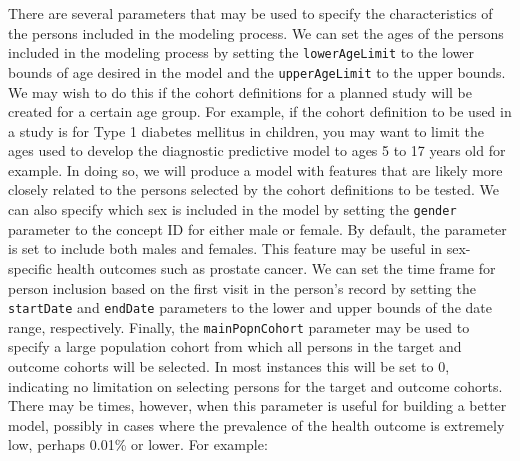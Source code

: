 \documentclass[11pt]{book}
\theoremstyle{definition}
\theoremstyle{definition}
\theoremstyle{definition}
\theoremstyle{remark}
\begin{document}
There are several parameters that may be used to specify the
characteristics of the persons included in the modeling process. We can
set the ages of the persons included in the modeling process by setting
the \texttt{lowerAgeLimit} to the lower bounds of age desired in the
model and the \texttt{upperAgeLimit} to the upper bounds. We may wish to
do this if the cohort definitions for a planned study will be created
for a certain age group. For example, if the cohort definition to be
used in a study is for Type 1 diabetes mellitus in children, you may
want to limit the ages used to develop the diagnostic predictive model
to ages 5 to 17 years old for example. In doing so, we will produce a
model with features that are likely more closely related to the persons
selected by the cohort definitions to be tested. We can also specify
which sex is included in the model by setting the \texttt{gender}
parameter to the concept ID for either male or female. By default, the
parameter is set to include both males and females. This feature may be
useful in sex-specific health outcomes such as prostate cancer. We can
set the time frame for person inclusion based on the first visit in the
person's record by setting the \texttt{startDate} and \texttt{endDate}
parameters to the lower and upper bounds of the date range,
respectively. Finally, the \texttt{mainPopnCohort} parameter may be used
to specify a large population cohort from which all persons in the
target and outcome cohorts will be selected. In most instances this will
be set to 0, indicating no limitation on selecting persons for the
target and outcome cohorts. There may be times, however, when this
parameter is useful for building a better model, possibly in cases where
the prevalence of the health outcome is extremely low, perhaps 0.01\% or
lower. For example:
\end{document}
